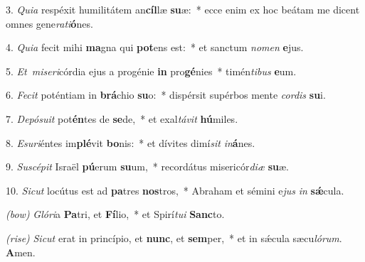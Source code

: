 3. \textit{Quia} respéxit humilitátem an\textbf{cíl}læ \textbf{su}æ:~*
	ecce enim ex hoc beátam me dicent omnes gene\textit{ra}\textit{ti}\textbf{ó}nes.

4. \textit{Quia} fecit mihi \textbf{ma}gna qui \textbf{pot}ens est:~*
	et sanctum \textit{no}\textit{men} \textbf{e}jus.

5. \textit{Et\ miseri}córdia ejus a progénie \textbf{in} pro\textbf{gé}nies~*
	timén\textit{ti}\textit{bus} \textbf{e}um.

6. \textit{Fecit} poténtiam in \textbf{brá}chio \textbf{su}o:~*
	dispérsit supérbos mente \textit{cor}\textit{dis} \textbf{su}i.

7. \textit{Depósuit} pot\textbf{én}tes de \textbf{se}de,~*
	et exal\textit{tá}\textit{vit} \textbf{hú}miles.

8. \textit{Esuri}éntes im\textbf{plé}vit \textbf{bo}nis:~*
	et dívites dimí\textit{sit} \textit{in}\textbf{á}nes.

9. \textit{Suscépit} Israël \textbf{pú}erum \textbf{su}um,~*
	recordátus misericór\textit{di}\textit{æ} \textbf{su}æ.

10. \textit{Sicut} locútus est ad \textbf{pa}tres \textbf{nos}tros,~*
	Abraham et sémini e\textit{jus} \textit{in} \textbf{s\'{\ae}}cula.

\textit{(bow)} \textit{Glóri}a \textbf{Pa}tri, et \textbf{Fí}lio,~*
	et Spirí\textit{tu}\textit{i} \textbf{Sanc}to.

\textit{(rise)} \textit{Sicut} erat in princípio, et \textbf{nunc}, et \textbf{sem}per,~*
	et in s\'{\ae}cula sæcu\textit{ló}\textit{rum}. \textbf{A}men.